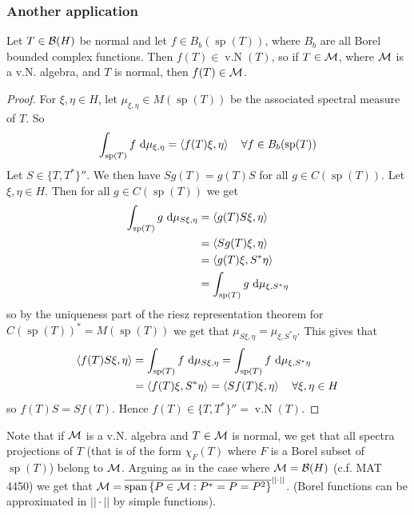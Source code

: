 \documentclass[10pt,english,a4paper]{article}
\theoremstyle{definition}
\DeclareMathOperator{\Sp}{sp}
\DeclareMathOperator{\vN}{v.N}
\begin{document}
\subsubsection*{Another application}
Let $T \in \mathcal{B}(H)$ be normal and let $f \in B_{b}(\Sp(T))$, where 
$B_{b}$ are all Borel bounded complex functions. Then 
$f(T) \in \vN(T)$, so if $T \in \mathcal{M}$, where $\mathcal{M}$ is a v.N. algebra, and 
$T$ is normal, then $f(T) \in \mathcal{M}$. 
\begin{proof}
    For $\xi,\eta \in H$, let $\mu_{\xi,\eta} \in M(\Sp(T))$ be the associated 
spectral measure of $T$. 
So 
\[ \int_{\Sp(T)} f \d\mu_{\xi,\eta} = \ind{f(T)\xi,\eta} \quad\forall f \in B_{b}(\Sp(T)) \]
Let $S \in\{T, T^*\}''$. We then have 
$Sg(T) = g(T)S$ for all $g \in C(\Sp(T))$. 
Let $\xi,\eta \in H$. Then for all $g \in C(\Sp(T))$ we get 
\begin{align*}
    \int_{\Sp(T)} g \d\mu_{S\xi,\eta} &= \ind{g(T)S\xi,\eta} \\
    &= \ind{Sg(T)\xi,\eta} \\
    &= \ind{g(T)\xi,S^*\eta} \\
    &= \int_{\Sp(T)} g \d \mu_{\xi,S^*\eta}
\end{align*}
so by the uniqueness part of the riesz representation theorem for 
$C(\Sp(T))^* = M(\Sp(T))$ we get that 
$\mu_{S\xi,\eta} = \mu_{\xi,S^*\eta}$.
This gives that 
\begin{align*}
    \ind{f(T)S\xi,\eta} 
&= \int_{\Sp(T)} f\d\mu_{S\xi,\eta} 
= \int_{\Sp(T)} f\d\mu_{\xi,S^*\eta} \\
&= \ind{f(T)\xi, S^*\eta} 
= \ind{Sf(T)\xi,\eta} \quad \forall \xi,\eta \in H
\end{align*}
so $f(T)S = Sf(T)$. Hence $f(T) \in \{T,T^*\}'' = \vN(T)$.
\end{proof}
Note that if $\mathcal{M}$ is a v.N. algebra and $T \in \mathcal{M}$ is normal, we get that all
spectra projections of $T$ (that is of the form $\chi_F(T)$ where $F$ is a Borel
subset of $\Sp(T)$) belong to $\mathcal{M}$.
Arguing as in the case where $\mathcal{M} = \mathcal{B}(H)$ (c.f. MAT 4450) we get that 
$\mathcal{M} = \overline{\text{span} \left\{P\in \mathcal{M}: P^* = P = P^2\right\}}^{||\cdot||}$.
(Borel functions can be approximated in $||\cdot||$ by simple functions). 
\end{document}
